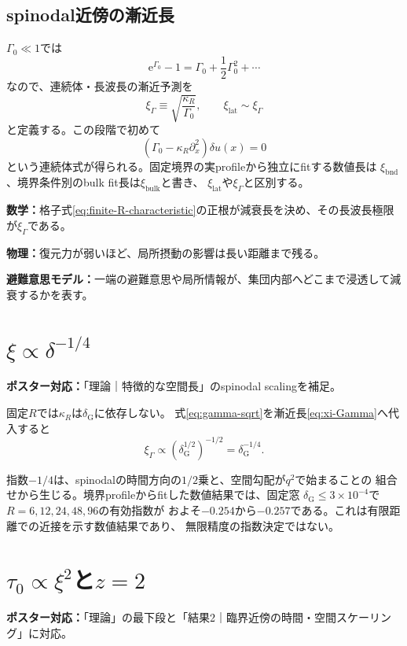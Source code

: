 \documentclass[a4paper,12pt]{ltjsarticle}
\newcommand{\PosterMap}[1]{%
  \begin{tcolorbox}[enhanced,boxrule=0pt,arc=1mm,colback=softgray,
    left=2mm,right=2mm,top=1mm,bottom=1mm,before skip=0pt,after skip=0.7em]
  \normalsize\textbf{ポスター対応：}#1
  \end{tcolorbox}}
\newcommand{\Meaning}[3]{%
  \begin{tcolorbox}[enhanced,breakable,colback=softteal,colframe=teal,
    boxrule=0.6pt,arc=1.2mm,left=3mm,right=3mm,top=2mm,bottom=2mm,
    title=式の読み方,fonttitle=\bfseries]
  \textbf{数学：}#1\par
  \textbf{物理：}#2\par
  \textbf{避難意思モデル：}#3
  \end{tcolorbox}}
\newcommand{\e}{\mathrm e}
\newcommand{\Gauss}{\mathrm G}
\newcommand{\bnd}{\mathrm{bnd}}
\newcommand{\bulk}{\mathrm{bulk}}
\begin{document}
\subsection{spinodal近傍の漸近長}

$\Gamma_0\ll1$では
\begin{equation}
 \e^{\Gamma_0}-1=\Gamma_0+\frac12\Gamma_0^2+\cdots
\end{equation}
なので、連続体・長波長の漸近予測を
\begin{equation}
 \boxed{\xi_{\Gamma}\equiv\sqrt{\frac{\kappa_R}{\Gamma_0}}},
 \qquad \xi_{\mathrm{lat}}\sim\xi_{\Gamma}
 \label{eq:xi-Gamma}
\end{equation}
と定義する。この段階で初めて
\begin{equation}
 \left(\Gamma_0-\kappa_R\partial_x^2\right)\delta u(x)=0
 \label{eq:continuum-boundary}
\end{equation}
という連続体式が得られる。固定境界の実profileから独立にfitする数値長は
$\xi_{\bnd}$、境界条件別のbulk fit長は$\xi_{\bulk}$と書き、
$\xi_{\mathrm{lat}}$や$\xi_{\Gamma}$と区別する。

\Meaning
{格子式\eqref{eq:finite-R-characteristic}の正根が減衰長を決め、その長波長極限が$\xi_{\Gamma}$である。}
{復元力が弱いほど、局所摂動の影響は長い距離まで残る。}
{一端の避難意思や局所情報が、集団内部へどこまで浸透して減衰するかを表す。}

\section{\texorpdfstring{$\xi\propto\delta^{-1/4}$}{xi proportional to delta to the minus one-quarter}}\label{sec:xi-scaling}
\PosterMap{「理論｜特徴的な空間長」のspinodal scalingを補足。}

固定$R$では$\kappa_R$は$\delta_{\Gauss}$に依存しない。
式\eqref{eq:gamma-sqrt}を漸近長\eqref{eq:xi-Gamma}へ代入すると
\begin{equation}
 \boxed{\xi_{\Gamma}\propto
 \left(\delta_{\Gauss}^{1/2}\right)^{-1/2}
 =\delta_{\Gauss}^{-1/4}}.
 \label{eq:xi-quarter}
\end{equation}

指数$-1/4$は、spinodalの時間方向の$1/2$乗と、空間勾配が$q^2$で始まることの
組合せから生じる。境界profileからfitした数値結果では、固定窓
$\delta_{\Gauss}\le3\times10^{-4}$で$R=6,12,24,48,96$の有効指数が
およそ$-0.254$から$-0.257$である。これは有限距離での近接を示す数値結果であり、
無限精度の指数決定ではない。

\section{\texorpdfstring{$\tau_0\propto\xi^2$}{tau-zero proportional to xi-squared}と\texorpdfstring{$z=2$}{z = 2}}\label{sec:z2}
\PosterMap{「理論」の最下段と「結果2｜臨界近傍の時間・空間スケーリング」に対応。}
\end{document}

